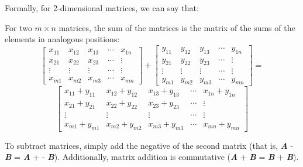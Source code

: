 Formally, for 2-dimensional matrices, we can say that:
\begin{mdframed}[style = important, frametitle={Adding and Subtracting Matrics}]
For two $m \times n$ matrices, the sum of the matrices is the matrix of the
sums of the elements in analogous positions:
$$\begin{bmatrix}
x_{11} & x_{12} & x_{13} & \cdots & x_{1n}\\
x_{21} & x_{22} & x_{23} & \cdots & \vdots\\
\vdots & \vdots & \vdots & \cdots & \vdots\\
x_{m1} & x_{m2} & x_{m3} & \cdots & x_{mn}
\end{bmatrix}
+ \begin{bmatrix}
y_{11} & y_{12} & y_{13} & \cdots & y_{1n}\\
y_{21} & y_{22} & y_{23} & \cdots & \vdots\\
\vdots & \vdots & \vdots & \cdots & \vdots\\
y_{m1} & y_{m2} & y_{m3} & \cdots & y_{mn}
\end{bmatrix} = $$
$$\begin{bmatrix}
x_{11} + y_{11} & x_{12} + y_{12} & x_{13} + y_{13} & \cdots & x_{1n} + y_{1n}\\
x_{21} + y_{21} & x_{22} + y_{22} & x_{23} + y_{23} & \cdots & \vdots\\
\vdots & \vdots & \vdots & \cdots & \vdots\\
x_{m1} + y_{m1} & x_{m2} + y_{m2} & x_{m3} + y_{m3} & \cdots & x_{mn} + y_{mn}
\end{bmatrix}$$

To subtract matrices, simply add the negative of the second matrix (that is,
\textbf{\textit{A}} - \textbf{\textit{B}} = \textbf{\textit{A}} + -\textbf{
\textit{B}}). Additionally, matrix addition is commutative (\textbf{\textit{A}}
+ \textbf{\textit{B}} = \textbf{\textit{B}} + \textbf{\textit{B}}).
\end{mdframed}

